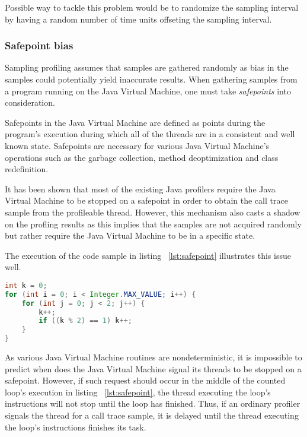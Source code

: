 \documentclass[..thesis.tex]{subfiles}
\begin{document}
Possible way to tackle this problem would be to randomize the sampling interval by having a random number of time units offseting the sampling interval. 

\subsubsection{Safepoint bias}

Sampling profiling assumes that samples are gathered randomly as bias in the samples could potentially yield inaccurate results. When gathering samples from a program running on the Java Virtual Machine, one must take \textit{safepoints} into consideration. 

Safepoints in the Java Virtual Machine are defined as points during the program's execution during which all of the threads are in a consistent and well known state. Safepoints are necessary for various Java Virtual Machine's operations such as the garbage collection, method deoptimization and class redefinition. \cite{hotspot_glossary}

It has been shown that most of the existing Java profilers require the Java Virtual Machine to be stopped on a safepoint in order to obtain the call trace sample from the profileable thread.\cite{wakart_psychosomatic_2016} However, this mechanism also casts a shadow on the profling results as this implies that the samples are not acquired randomly but rather require the Java Virtual Machine to be in a specific state. \cite{mytkowicz_evaluating_2010}

The execution of the code sample in listing ~\ref{lst:safepoint} illustrates this issue well. 
\begin{lstlisting}[language=java,style=def,label={lst:safepoint}, caption={Counted loops do not contain safepoints}]
int k = 0;
for (int i = 0; i < Integer.MAX_VALUE; i++) {
	for (int j = 0; j < 2; j++) {
    	k++;
    	if ((k % 2) == 1) k++;
	}
}
\end{lstlisting}
As various Java Virtual Machine routines are nondeterministic, it is impossible to predict when does the Java Virtual Machine signal its threads to be stopped on a safepoint. However, if such request should occur in the middle of the counted loop's execution in listing ~\ref{lst:safepoint}, the thread executing the loop's instructions will not stop until the loop has finished. Thus, if an ordinary profiler signals the thread for a call trace sample, it is delayed until the thread executing the loop's instructions finishes its task. \cite{wakart_psychosomatic_2015}
\end{document}
